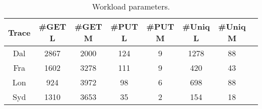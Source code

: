
\begin{table}[h!]
	\scriptsize
	\caption{Workload parameters.}
	\begin{tabular}{| c | c | c | c | c | c | c| c |} 
		\hline
	Trace    &   \#GET L & \#GET M & \#PUT L & \#PUT M & \#Uniq L & \#Uniq M \\ 
		\hline\hline
		Dal    &  2867  & 2000   & 124  & 9     & 1278 & 88      \\ 
		\hline
		Fra     &  1602  & 3278   & 111  & 9     & 420 & 43     \\
		\hline
		Lon    &  924    & 3972   & 98  & 6      & 698 & 88    \\
		\hline 
		Syd      &  1310   & 3653   & 35 & 2     & 154 & 18      \\  
		\hline
	\end{tabular}

\label{tab:eval-overall}
\end{table}


%	


%	

